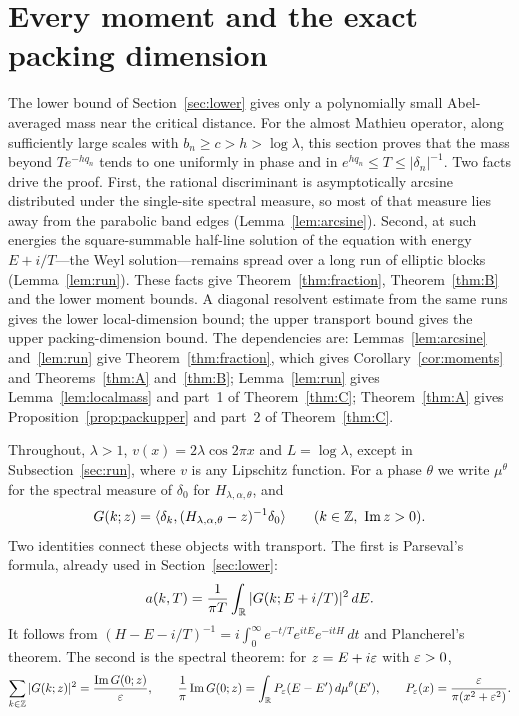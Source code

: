 \section{Every moment and the exact packing dimension}\label{sec:moments}

The lower bound of Section~\ref{sec:lower} gives only a polynomially small Abel-averaged mass near the critical distance. For the almost Mathieu operator, along sufficiently large scales with $b_n\ge c>h>\log\lambda$, this section proves that the mass beyond $Te^{-hq_n}$ tends to one uniformly in phase and in $e^{hq_n}\le T\le|\delta_n|^{-1}$. Two facts drive the proof. First, the rational discriminant is asymptotically arcsine distributed under the single-site spectral measure, so most of that measure lies away from the parabolic band edges (Lemma~\ref{lem:arcsine}). Second, at such energies the square-summable half-line solution of the equation with energy $E+i/T$---the Weyl solution---remains spread over a long run of elliptic blocks (Lemma~\ref{lem:run}). These facts give Theorem~\ref{thm:fraction}, Theorem~\ref{thm:B} and the lower moment bounds. A diagonal resolvent estimate from the same runs gives the lower local-dimension bound; the upper transport bound gives the upper packing-dimension bound. The dependencies are: Lemmas~\ref{lem:arcsine} and~\ref{lem:run} give Theorem~\ref{thm:fraction}, which gives Corollary~\ref{cor:moments} and Theorems~\ref{thm:A} and~\ref{thm:B}; Lemma~\ref{lem:run} gives Lemma~\ref{lem:localmass} and part~1 of Theorem~\ref{thm:C}; Theorem~\ref{thm:A} gives Proposition~\ref{prop:packupper} and part~2 of Theorem~\ref{thm:C}.

Throughout, $\lambda>1$, $v(x)=2\lambda\cos2\pi x$ and $L=\log\lambda$, except in Subsection~\ref{sec:run}, where $v$ is any Lipschitz function. For a phase $\theta$ we write $\mu^\theta$ for the spectral measure of $\delta_0$ for $H_{\lambda,\alpha,\theta}$, and
\[
G(k;z)=\langle\delta_k,(H_{\lambda,\alpha,\theta}-z)^{-1}\delta_0\rangle\qquad(k\in\Z,\ \operatorname{Im}z>0).
\]
Two identities connect these objects with transport. The first is Parseval's formula, already used in Section~\ref{sec:lower}:
\begin{equation}\label{eq:parseval}
a(k,T)=\frac1{\pi T}\int_\mathbb R|G(k;E+i/T)|^2\,dE .
\end{equation}
It follows from $(H-E-i/T)^{-1}=i\int_0^\infty e^{-t/T}e^{itE}e^{-itH}\,dt$ and Plancherel's theorem. The second is the spectral theorem: for $z=E+i\varepsilon$ with $\varepsilon>0$,
\begin{equation}\label{eq:poisson}
\sum_{k\in\mathbb Z}|G(k;z)|^2=\frac{\operatorname{Im}G(0;z)}{\varepsilon},\qquad
\frac1\pi\operatorname{Im}G(0;z)=\int_\mathbb R P_\varepsilon(E-E')\,d\mu^\theta(E'),\qquad P_\varepsilon(x)=\frac{\varepsilon}{\pi(x^2+\varepsilon^2)}.
\end{equation}

